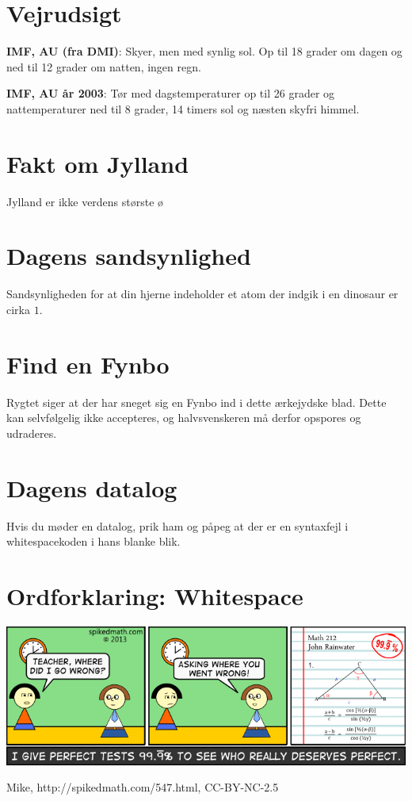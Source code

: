 \begin{minipage}[b]{0.95\linewidth}
\begin{minipage}[t]{0.47\textwidth}
\section*{Vejrudsigt}
\textbf{IMF, AU (fra DMI)}: Skyer, men med synlig sol. Op til 18 grader om dagen og ned til 12 grader om natten, ingen regn.

\textbf{IMF, AU år 2003}: Tør med dagstemperaturer op til 26 grader og nattemperaturer ned til 8 grader, 14 timers sol og næsten skyfri himmel.

\section*{Fakt om Jylland}
Jylland er ikke verdens største ø

\section*{Dagens sandsynlighed}
Sandsynligheden for at din hjerne indeholder et atom der indgik i en dinosaur er cirka $1$.

\section*{Find en Fynbo}
Rygtet siger at der har sneget sig en Fynbo ind i dette ærkejydske blad. Dette kan selvfølgelig ikke accepteres, og halvsvenskeren må derfor opspores og udraderes.

\section*{Dagens datalog}
Hvis du møder en datalog, prik ham og påpeg at der er en syntaxfejl i whitespacekoden i hans blanke blik.

\section*{Ordforklaring: Whitespace}
\vspace{4cm}
\end{minipage}

\includegraphics[width=\textwidth]{547-the-perfect-score.png}
\begin{center}
\tiny Mike, http://spikedmath.com/547.html, CC-BY-NC-2.5


\end{center}
\end{minipage}
